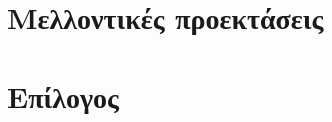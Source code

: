 
\section{Μελλοντικές προεκτάσεις}\label{sec:futureImprovements}


\section{Επίλογος}\label{sec:conclusion}